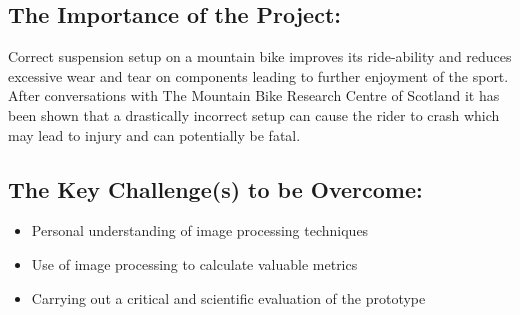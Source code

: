\documentclass[a4paper, 12pt]{article}
\begin{document}
	\subsection[Importance]{The Importance of the Project:}
	Correct suspension setup on a mountain bike improves its ride-ability and reduces excessive wear and tear on components leading to further enjoyment of the sport. After conversations with The Mountain Bike Research Centre of Scotland it has been shown that a drastically incorrect setup can cause the rider to crash which may lead to injury and can potentially be fatal. 
	
	\subsection[Challenges]{The Key Challenge(s) to be Overcome:}
	\begin{itemize}
		\item Personal understanding of image processing techniques
		\item Use of image processing to calculate valuable metrics
		\item Carrying out a critical and scientific evaluation of the prototype
	\end{itemize}
\end{document}
